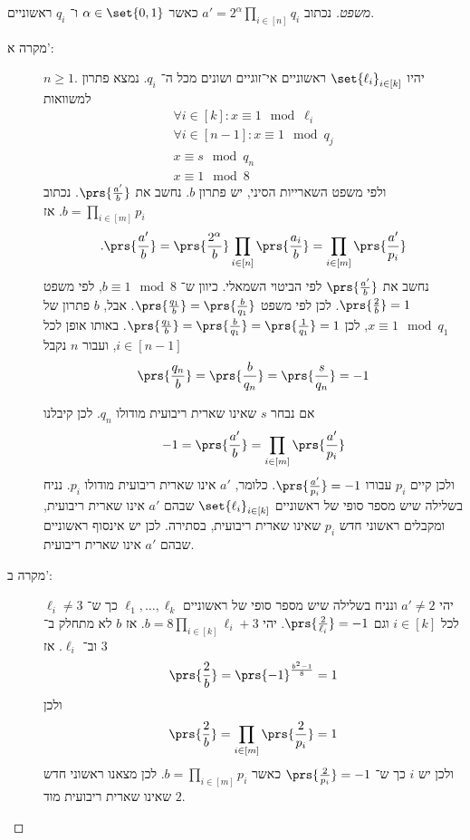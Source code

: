 \documentclass[a4paper,10pt,twoside,openany]{book}
\begin{document}
\begin{proof}[משפט]
נכתוב
$a' = 2^{\alpha} \prod_{i \in [n]} q_i$
כאשר
$\alpha \in \set{0,1}$
ו־%
$q_i$
ראשוניים.

\begin{description}
\item[מקרה א':]
$n \geq 1$.
יהיו
$\set{\ell_i}_{i \in [k]}$
ראשוניים אי־זוגיים ושונים מכל ה־%
$q_i$.
נמצא פתרון למשוואות
\begin{align*}
\forall i \in [k] \colon x \equiv 1 \mod{\ell_i} \\
\forall i \in [n-1] \colon x \equiv 1 \mod{q_j} \\
x \equiv s \mod{q_n} \\
x \equiv 1 \mod{8}
\end{align*}
ולפי משפט השארייות הסיני, יש פתרון
$b$.
נחשב את
$\prs{\frac{a'}{b}}$.
נכתוב
$b = \prod_{i \in [m]} p_i$.
אז
\[\text{.}\prs{\frac{a'}{b}} = \prs{\frac{2^\alpha}{b}} \prod_{i\in[n]} \prs{\frac{a_i}{b}} = \prod_{i\in[m]} \prs{\frac{a'}{p_i}}\]
נחשב את
$\prs{\frac{a'}{b}}$
לפי הביטוי השמאלי.
כיוון ש־%
$b \equiv 1 \mod{8}$,
לפי משפט
$\prs{\frac{2}{b}} = 1$.
לכן לפי משפט
$\prs{\frac{q_1}{b}} = \prs{\frac{b}{q_1}}$.
אבל,
$b$
פתרון של
$x \equiv 1 \mod{q_1}$,
לכן
$\prs{\frac{q_1}{b}} = \prs{\frac{b}{q_1}} = \prs{\frac{1}{q_1}} = 1$.
באותו אופן לכל
$i \in [n-1]$,
ועבור
$n$
נקבל
\[\prs{\frac{q_n}{b}} = \prs{\frac{b}{q_n}} = \prs{\frac{s}{q_n}} = -1\]

אם נבחר
$s$
שאינו שארית ריבועית מודולו
$q_n$.
לכן קיבלנו
\[-1 = \prs{\frac{a'}{b}} = \prod_{i \in [m]} \prs{\frac{a'}{p_i}}\]
ולכן קיים
$p_i$
עבורו
$\prs{\frac{a'}{p_i}} = -1$.
כלומר,
$a'$
אינו שארית ריבועית מודולו
$p_i$.
נניח בשלילה שיש מספר סופי של ראשוניים
$\set{\ell_i}_{i \in [k]}$
שבהם
$a'$
אינו שארית ריבועית, ומקבלים ראשוני חדש
$p_i$
שאינו שארית ריבועית, בסתירה.
לכן יש אינסוף ראשוניים שבהם
$a'$
אינו שארית ריבועית.

\item[מקרה ב':]
יהי
$a' \neq 2$
ונניח בשלילה שיש מספר סופי של ראשוניים
$\ell_1, \ldots, \ell_k$
כך ש־%
$\ell_i \neq 3$
לכל
$i \in [k]$
וגם
$\prs{\frac{2}{\ell_i}} = -1$.
יהי
$b = 8 \prod_{i \in [k]} \ell_i + 3$.
אז
$b$
לא מתחלק ב־%
$3$
וב־%
$\ell_i$.
אז
\[\prs{\frac{2}{b}} = \prs{-1}^{\frac{b^2 - 1}{8}} = 1\]
ולכן
\[\prs{\frac{2}{b}} = \prod_{i \in [m]} \prs{\frac{2}{p_i}} = 1\]
ולכן יש
$i$
כך ש־%
$\prs{\frac{2}{p_i}} = -1$
כאשר
$b = \prod_{i\in[m]} p_i$.
לכן מצאנו ראשוני חדש שאינו שארית ריבועית מוד
$2$.
\end{description}
\end{proof}
\end{document}
